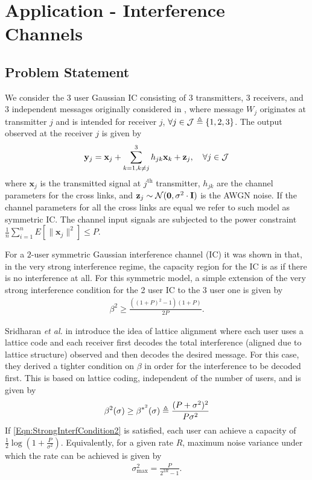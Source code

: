 \documentclass[journal,twocolumn]{IEEEtran}
\begin{document}
\section{Application - Interference Channels}
\subsection{Problem Statement}
We consider the 3 user Gaussian IC consisting of 3 transmitters, 3 receivers, and 3 independent messages originally considered in \cite{sridharan2008capacity}, where message $W_{j}$ originates at transmitter $j$ and is intended for receiver $j$, $\forall j\in \mathcal{J}\triangleq\{1,2,3\}$. The output observed at the receiver $j$ is given by
\begin{align}\label{SymmInterfChannel}
    \mathbf{y}_{j}=\mathbf{x}_{j}+ \sum^{3}_{k=1,k\neq j}h_{jk}\mathbf{x}_{k}+\mathbf{z}_{j}, \hspace{10pt} \forall j\in \mathcal{J}
\end{align}
where $\mathbf{x}_{j}$ is the transmitted signal at $j^{\text{th}}$ transmitter, $h_{jk}$ are the channel parameters for the cross links, and $\mathbf{z}_{j}\sim\mathcal{N}(\mathbf{0},\sigma^{2}\cdot \mathbf{I})$ is the AWGN noise. If the channel parameters for all the cross links are equal we refer to such model as symmetric IC. The channel input signals are subjected to the power constraint
$\frac{1}{n}\sum_{i=1}^{n}E\left[\|\mathbf{x}_{j}\|^2\right]\leq P$.

For a $2$-user symmetric Gaussian interference channel (IC) it was shown in \cite{carleial1978interference} that, in the very strong interference regime, the capacity region for the IC is as if there is no interference at all. For this symmetric model, a simple extension of the very strong interference condition for the 2 user IC %
to the 3 user one is given by \cite{sridharan2008capacity}
\begin{align}
\beta^{2}\geq \frac{\left((1+P)^{2}-1\right)\left(1+P\right)}{2P}.
\label{Eqn:StrongInterfCondition1}
\end{align}

Sridharan \textit{et al.} in \cite{sridharan2008capacity} introduce the idea of lattice alignment where each user uses a lattice code and each receiver first decodes the total interference (aligned due to lattice structure) observed and then decodes the desired message. For this case, they
derived a tighter condition on $\beta$ in order for the interference to be decoded first. This is based on lattice coding, independent of the number of users, and is given by
\begin{align}
\beta^{2}(\sigma)\geq \beta^{*^{2}}(\sigma)\triangleq\frac{(P+\sigma^{2})^{2}}{P\sigma^{2}}
\label{Eqn:StrongInterfCondition2}
\end{align}
If \eqref{Eqn:StrongInterfCondition2} is satisfied, each user can achieve a capacity \cite{sridharan2008capacity} of
$\frac{1}{2}\log(1+\frac{P}{\sigma^{2}})$. Equivalently, for a given rate $R$, maximum noise variance under which the rate can be achieved is given by
\begin{align}
\sigma^{2}_{\text{max}}=\frac{P}{2^{2R}-1}.
\label{Eqn:SigmaShannon}
\end{align}
\end{document}
